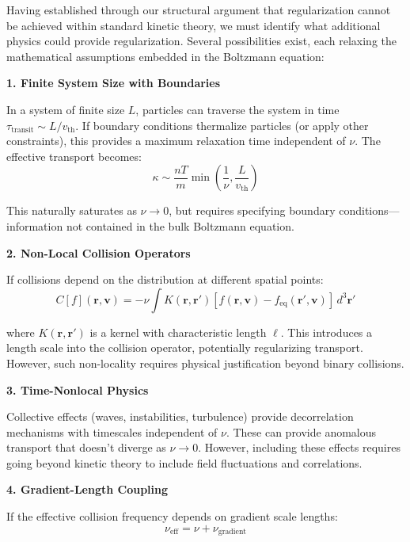 \documentclass[12pt,a4paper]{article}
\newcommand{\vect}[1]{\mathbf{#1}}
\begin{document}
Having established through our structural argument that regularization cannot be achieved within standard kinetic theory, we must identify what additional physics could provide regularization. Several possibilities exist, each relaxing the mathematical assumptions embedded in the Boltzmann equation:

\textbf{1. Finite System Size with Boundaries}

In a system of finite size $L$, particles can traverse the system in time $\tau_{\text{transit}} \sim L/v_{\text{th}}$. If boundary conditions thermalize particles (or apply other constraints), this provides a maximum relaxation time independent of $\nu$. The effective transport becomes:
\begin{equation}
\kappa \sim \frac{nT}{m} \min\left(\frac{1}{\nu}, \frac{L}{v_{\text{th}}}\right)
\label{eq:boundary_regularization}
\end{equation}

This naturally saturates as $\nu \to 0$, but requires specifying boundary conditions—information not contained in the bulk Boltzmann equation.

\textbf{2. Non-Local Collision Operators}

If collisions depend on the distribution at different spatial points:
\begin{equation}
C[f](\vect{r}, \vect{v}) = -\nu \int K(\vect{r}, \vect{r}') [f(\vect{r}, \vect{v}) - f_{\text{eq}}(\vect{r}', \vect{v})] \, d^3\vect{r}'
\label{eq:nonlocal_operator}
\end{equation}

where $K(\vect{r}, \vect{r}')$ is a kernel with characteristic length $\ell$. This introduces a length scale into the collision operator, potentially regularizing transport. However, such non-locality requires physical justification beyond binary collisions.

\textbf{3. Time-Nonlocal Physics}

Collective effects (waves, instabilities, turbulence) provide decorrelation mechanisms with timescales independent of $\nu$. These can provide anomalous transport that doesn't diverge as $\nu \to 0$. However, including these effects requires going beyond kinetic theory to include field fluctuations and correlations.

\textbf{4. Gradient-Length Coupling}

If the effective collision frequency depends on gradient scale lengths:
\begin{equation}
\nu_{\text{eff}} = \nu + \nu_{\text{gradient}}
\label{eq:gradient_coupling}
\end{equation}
\end{document}
